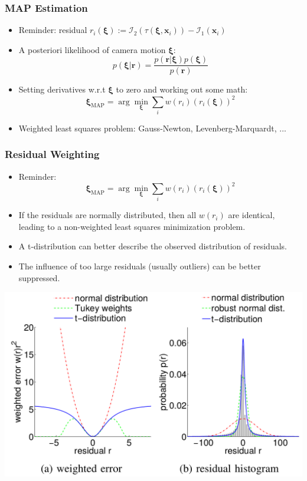 \begin{frame}
\frametitle{MAP Estimation}

\begin{itemize}
    \item Reminder: residual $r_i(\boldsymbol{\xi}) := \mathcal{I}_2\left(\tau\left(\boldsymbol{\xi}, \mathbf{x}_i\right)\right)-\mathcal{I}_1\left(\mathbf{x}_i\right)$
    \vspace{1em}\item A posteriori likelihood of camera motion $\boldsymbol{\xi}$:
    $$p(\boldsymbol{\xi} | \mathbf{r})=\frac{p(\mathbf{r} | \boldsymbol{\xi}) p(\boldsymbol{\xi})}{p(\mathbf{r})}$$
    \item Setting derivatives w.r.t $\boldsymbol{\xi}$ to zero and working out some math:
    $$\boldsymbol{\xi}_{\mathrm{MAP}}=\arg \min _{\boldsymbol{\xi}} \sum_{i} w\left(r_{i}\right)\left(r_{i}(\boldsymbol{\xi})\right)^{2}$$
    \item Weighted least squares problem: Gauss-Newton, Levenberg-Marquardt, ...
    \vfill
\end{itemize}

\end{frame}
\clearpage

\begin{frame}
\frametitle{Residual Weighting}

\vspace{1.5em}
\begin{multicols}{2}
    \begin{itemize}
        \item Reminder:$$\boldsymbol{\xi}_{\mathrm{MAP}}=\arg \min _{\boldsymbol{\xi}} \sum_{i} w\left(r_{i}\right)\left(r_{i}(\boldsymbol{\xi})\right)^{2}$$
        \vfill\item If the residuals are normally distributed, then all $w(r_i)$ are identical, leading to a non-weighted least squares minimization problem.
        \vfill\item A t-distribution can better describe the observed distribution of residuals.
        \vfill\item The influence of too large residuals (usually outliers) can be better suppressed.
    \end{itemize}
    \vfill\columnbreak
    \includegraphics[width=\columnwidth]{Bilder/distribution.png}%
\end{multicols}

\end{frame}
\clearpage

